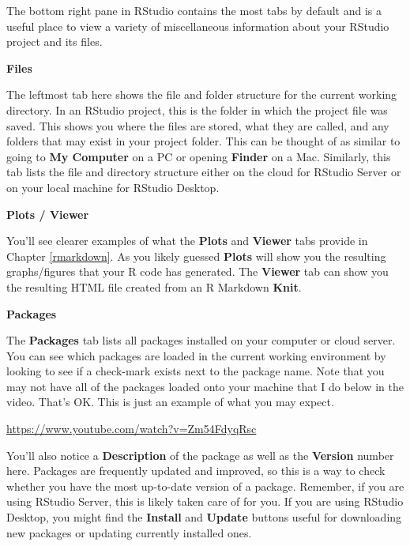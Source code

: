 \documentclass[]{tufte-book}
\begin{document}
The bottom right pane in RStudio contains the most tabs by default and is a useful place to view a variety of miscellaneous information about your RStudio project and its files.

\vspace*{0.2in}

\noindent\textbf{Files}\vspace*{0.1in}

The leftmost tab here shows the file and folder structure for the current working directory. In an RStudio project, this is the folder in which the project file was saved. This shows you where the files are stored, what they are called, and any folders that may exist in your project folder. This can be thought of as similar to going to \textbf{My Computer} on a PC or opening \textbf{Finder} on a Mac. Similarly, this tab lists the file and directory structure either on the cloud for RStudio Server or on your local machine for RStudio Desktop.

\vspace*{0.2in}

\noindent\textbf{Plots / Viewer}\vspace*{0.1in}

You'll see clearer examples of what the \textbf{Plots} and \textbf{Viewer} tabs provide in Chapter \ref{rmarkdown}. As you likely guessed \textbf{Plots} will show you the resulting graphs/figures that your R code has generated. The \textbf{Viewer} tab can show you the resulting HTML file created from an R Markdown \textbf{Knit}.

\vspace*{0.2in}

\noindent\textbf{Packages}\vspace*{0.1in}

The \textbf{Packages} tab lists all packages installed on your computer or cloud server. You can see which packages are loaded in the current working environment by looking to see if a check-mark exists next to the package name. Note that you may not have all of the packages loaded onto your machine that I do below in the video. That's OK. This is just an example of what you may expect.

\vspace{0.1in}\begin{center}\footnotesize{\url{https://www.youtube.com/watch?v=Zm54FdyqRsc}}\end{center}\vspace{0.1in}

You'll also notice a \textbf{Description} of the package as well as the \textbf{Version} number here. Packages are frequently updated and improved, so this is a way to check whether you have the most up-to-date version of a package. Remember, if you are using RStudio Server, this is likely taken care of for you. If you are using RStudio Desktop, you might find the \textbf{Install} and \textbf{Update} buttons useful for downloading new packages or updating currently installed ones.
\end{document}

